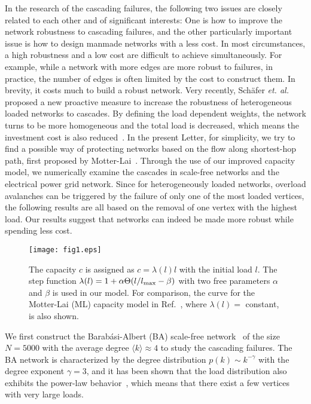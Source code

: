 \documentclass[doublecol]{epl2}
\begin{document}
In the research of the cascading failures, the following two issues
are closely related to each other and of significant interests: One
is how to improve the network robustness to cascading failures, and
the other particularly important issue is how to design manmade
networks with a less cost. In most circumstances, a high robustness
and a low cost are difficult to achieve simultaneously. For example,
while a network with more edges are more robust to failures, in
practice, the number of edges is often limited by the cost to
construct them. In brevity, it costs much to build a robust network.
 Very recently, Sch\"{a}fer \emph{et. al.} proposed a new
proactive measure to increase the robustness of heterogeneous loaded
networks to cascades. By defining the load dependent weights, the
network turns to be more homogeneous and the total load is
decreased, which means the investment cost is also
reduced~\cite{LoadCost}. In the present Letter, for simplicity, we
try to find a possible way of protecting networks based on the flow
along shortest-hop path, first proposed by
Motter-Lai~\cite{CasModel}. Through the use of our improved capacity
model, we numerically examine the cascades in scale-free networks
and the electrical power grid network. Since for heterogeneously
loaded networks, overload avalanches can be triggered by the failure
of only one of the most loaded vertices, the following results are
all based on the removal of one vertex with the highest load. Our
results suggest that networks can indeed be made more robust while
spending less cost.

\begin{figure}
{\texttt{[image: fig1.eps]}}
\caption{The capacity $c$ is assigned as $c = \lambda(l) l$ with the initial load
$l$. The step function $\lambda(l) = 1 + \alpha \Theta(l/l_{\rm max}
- \beta)$ with two free parameters $\alpha$ and $\beta$ is used in
our model. For comparison, the curve for the Motter-Lai (ML)
capacity model in Ref.~\cite{CasModel}, where $\lambda(l)=$
constant, is also shown. } \label{fig:step}
\end{figure}

We first construct the Barab\'asi-Albert (BA) scale-free
network~\cite{BAmodel} of the size $N=5000$ with the average degree
$\langle k \rangle\approx 4$ to study the cascading failures. The BA
network is characterized by the degree distribution
$p(k)\sim{k^{-\gamma}}$ with the degree exponent $\gamma=3$, and it
has been shown that the load distribution also exhibits the
power-law behavior~\cite{Loaddis}, which means that there exist a
few vertices with very large loads.
\end{document}
